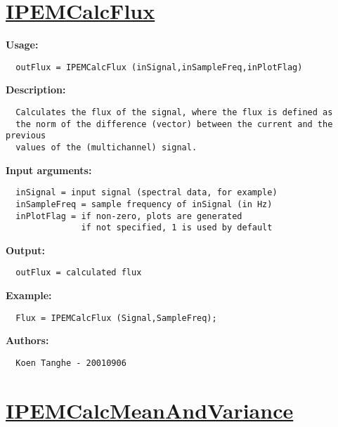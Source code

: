 \newpage
\section*{\hyperlink{Concepts:IPEMCalcFlux}{IPEMCalcFlux}}
\hypertarget{FuncRef:IPEMCalcFlux}{}

\textbf{Usage:}
\begin{verbatim}  outFlux = IPEMCalcFlux (inSignal,inSampleFreq,inPlotFlag)

\end{verbatim}
\textbf{Description:}
\begin{verbatim}  Calculates the flux of the signal, where the flux is defined as
  the norm of the difference (vector) between the current and the previous
  values of the (multichannel) signal.

\end{verbatim}
\textbf{Input arguments:}
\begin{verbatim}  inSignal = input signal (spectral data, for example)
  inSampleFreq = sample frequency of inSignal (in Hz)
  inPlotFlag = if non-zero, plots are generated
               if not specified, 1 is used by default

\end{verbatim}
\textbf{Output:}
\begin{verbatim}  outFlux = calculated flux

\end{verbatim}
\textbf{Example:}
\begin{verbatim}  Flux = IPEMCalcFlux (Signal,SampleFreq);

\end{verbatim}
\textbf{Authors:}
\begin{verbatim}  Koen Tanghe - 20010906
\end{verbatim}


\newpage
\section*{\hyperlink{Concepts:IPEMCalcMeanAndVariance}{IPEMCalcMeanAndVariance}}
\hypertarget{FuncRef:IPEMCalcMeanAndVariance}{}

